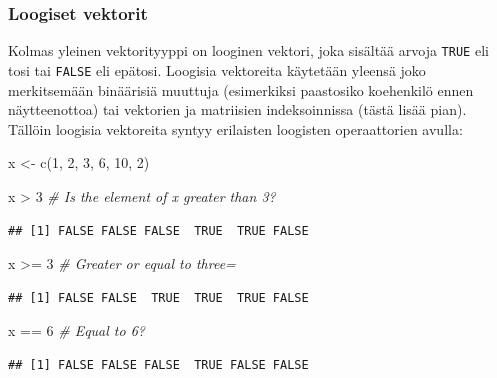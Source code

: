\documentclass[
]{book}
\newenvironment{Shaded}{\begin{snugshade}}{\end{snugshade}}
\newcommand{\CommentTok}[1]{\textcolor[rgb]{0.56,0.35,0.01}{\textit{#1}}}
\newcommand{\DecValTok}[1]{\textcolor[rgb]{0.00,0.00,0.81}{#1}}
\newcommand{\FunctionTok}[1]{\textcolor[rgb]{0.00,0.00,0.00}{#1}}
\newcommand{\NormalTok}[1]{#1}
\newcommand{\OtherTok}[1]{\textcolor[rgb]{0.56,0.35,0.01}{#1}}
\newcommand{\SpecialCharTok}[1]{\textcolor[rgb]{0.00,0.00,0.00}{#1}}
\begin{document}
\hypertarget{loogiset-vektorit}{%
\subsubsection{Loogiset vektorit}\label{loogiset-vektorit}}

Kolmas yleinen vektorityyppi on looginen vektori, joka sisältää arvoja \texttt{TRUE} eli tosi tai \texttt{FALSE} eli epätosi. Loogisia vektoreita käytetään yleensä joko merkitsemään binäärisiä muuttuja (esimerkiksi paastosiko koehenkilö ennen näytteenottoa) tai vektorien ja matriisien indeksoinnissa (tästä lisää pian). Tällöin loogisia vektoreita syntyy erilaisten loogisten operaattorien avulla:

\begin{Shaded}
\begin{Highlighting}[]
\NormalTok{x }\OtherTok{\textless{}{-}} \FunctionTok{c}\NormalTok{(}\DecValTok{1}\NormalTok{, }\DecValTok{2}\NormalTok{, }\DecValTok{3}\NormalTok{, }\DecValTok{6}\NormalTok{, }\DecValTok{10}\NormalTok{, }\DecValTok{2}\NormalTok{)}

\NormalTok{x }\SpecialCharTok{\textgreater{}} \DecValTok{3} \CommentTok{\# Is the element of x greater than 3?}
\end{Highlighting}
\end{Shaded}

\begin{verbatim}
## [1] FALSE FALSE FALSE  TRUE  TRUE FALSE
\end{verbatim}

\begin{Shaded}
\begin{Highlighting}[]
\NormalTok{x }\SpecialCharTok{\textgreater{}=} \DecValTok{3} \CommentTok{\# Greater or equal to three=}
\end{Highlighting}
\end{Shaded}

\begin{verbatim}
## [1] FALSE FALSE  TRUE  TRUE  TRUE FALSE
\end{verbatim}

\begin{Shaded}
\begin{Highlighting}[]
\NormalTok{x }\SpecialCharTok{==} \DecValTok{6} \CommentTok{\# Equal to 6?}
\end{Highlighting}
\end{Shaded}

\begin{verbatim}
## [1] FALSE FALSE FALSE  TRUE FALSE FALSE
\end{verbatim}
\end{document}
